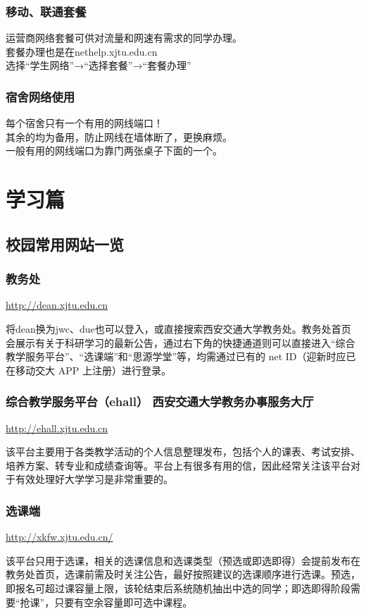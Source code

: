 \documentclass[
decoration,  %
]{qyxf-book}
\begin{document}
\subsection{移动、联通套餐}
\noindent 运营商网络套餐可供对流量和网速有需求的同学办理。\\
套餐办理也是在nethelp.xjtu.edu.cn\\
选择“学生网络”→“选择套餐”→“套餐办理”

\subsection{宿舍网络使用}
\noindent 每个宿舍只有一个有用的网线端口！\\
其余的均为备用，防止网线在墙体断了，更换麻烦。\\
一般有用的网线端口为靠门两张桌子下面的一个。


\chapter{学习篇}
\section{校园常用网站一览}
\subsection{教务处}
\url{http://dean.xjtu.edu.cn}

将dean换为jwc、due也可以登入，或直接搜索西安交通大学教务处。教务处首页会展示有关于科研学习的最新公告，通过右下角的快捷通道则可以直接进入“综合教学服务平台”、“选课端”和“思源学堂”等，均需通过已有的 net ID（迎新时应已在移动交大 APP 上注册）进行登录。

\subsection{综合教学服务平台（ehall） 西安交通大学教务办事服务大厅}
\url{http://ehall.xjtu.edu.cn}

该平台主要用于各类教学活动的个人信息整理发布，包括个人的课表、考试安排、培养方案、转专业和成绩查询等。平台上有很多有用的信，因此经常关注该平台对于有效处理好大学学习是非常重要的。

\subsection{选课端}
\url{http://xkfw.xjtu.edu.cn/}

该平台只用于选课，相关的选课信息和选课类型（预选或即选即得）会提前发布在教务处首页，选课前需及时关注公告，最好按照建议的选课顺序进行选课。预选，即报名可超过课容量上限，该轮结束后系统随机抽出中选的同学；即选即得阶段需要“抢课”，只要有空余容量即可选中课程。
\end{document}
